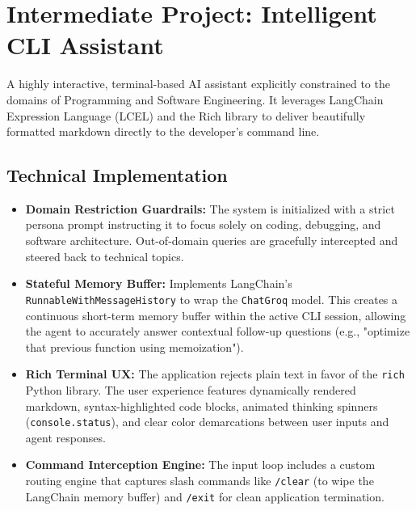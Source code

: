 \documentclass[12pt, a4paper]{article}
\begin{document}
\newpage

\section{Intermediate Project: Intelligent CLI Assistant}

\begin{tcolorbox}[colback=accent, colframe=primary, title=\textbf{Architectural Overview}, boxrule=1pt]
A highly interactive, terminal-based AI assistant explicitly constrained to the domains of Programming and Software Engineering. It leverages LangChain Expression Language (LCEL) and the Rich library to deliver beautifully formatted markdown directly to the developer's command line.
\end{tcolorbox}

\subsection{Technical Implementation}
\begin{itemize}[label=\textcolor{secondary}{$\bullet$}]
    \item \textbf{Domain Restriction Guardrails:} The system is initialized with a strict persona prompt instructing it to focus solely on coding, debugging, and software architecture. Out-of-domain queries are gracefully intercepted and steered back to technical topics.
    \item \textbf{Stateful Memory Buffer:} Implements LangChain's \texttt{RunnableWithMessageHistory} to wrap the \texttt{ChatGroq} model. This creates a continuous short-term memory buffer within the active CLI session, allowing the agent to accurately answer contextual follow-up questions (e.g., "optimize that previous function using memoization").
    \item \textbf{Rich Terminal UX:} The application rejects plain text in favor of the \texttt{rich} Python library. The user experience features dynamically rendered markdown, syntax-highlighted code blocks, animated thinking spinners (\texttt{console.status}), and clear color demarcations between user inputs and agent responses.
    \item \textbf{Command Interception Engine:} The input loop includes a custom routing engine that captures slash commands like \texttt{/clear} (to wipe the LangChain memory buffer) and \texttt{/exit} for clean application termination.
\end{itemize}
\end{document}
